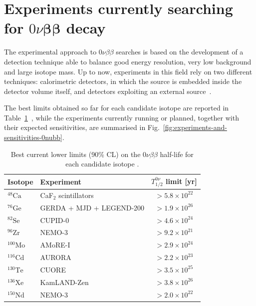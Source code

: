 \section{Experiments currently searching for \texorpdfstring{$0\nu\boldsymbol{\beta}\boldsymbol{\beta}$}{0nu beta beta} decay}
\label{sec:0nubb-experiments}
The experimental approach to $0\nu\beta\beta$ searches is based on the development of a detection technique able to balance good energy resolution, very low background and large isotope mass. Up to now, experiments in this field rely on two different techniques: calorimetric detectors, in which the source is embedded inside the detector volume itself, and detectors exploiting an external source~\cite{review-0nu-2015}. 

The best limits obtained so far for each candidate isotope are reported in Table~\ref{tab:0nubb-limits}~\cite{PDG:2026}, while the experiments currently running or planned, together with their expected sensitivities, are summarised in Fig.~\ref{fig:experiments-and-sensitivities-0nubb}.
\begin{table}[H]
    \centering
    \begin{tabular}{llc}
        \toprule
        Isotope & Experiment & $T_{1/2}^{0\nu}$ limit [yr] \\
        \midrule
        ${}^{48}\text{Ca}$  & CaF$_2$ scintillators     & $> 5.8 \times 10^{22}$ \\
        ${}^{76}\text{Ge}$  & GERDA + MJD + LEGEND-200  & $> 1.9 \times 10^{26}$ \\
        ${}^{82}\text{Se}$  & CUPID-0                   & $> 4.6 \times 10^{24}$ \\
        ${}^{96}\text{Zr}$  & NEMO-3                    & $> 9.2 \times 10^{21}$ \\
        ${}^{100}\text{Mo}$ & AMoRE-I                   & $> 2.9 \times 10^{24}$ \\
        ${}^{116}\text{Cd}$ & AURORA                    & $> 2.2 \times 10^{23}$ \\
        ${}^{130}\text{Te}$ & CUORE                     & $> 3.5 \times 10^{25}$ \\
        ${}^{136}\text{Xe}$ & KamLAND-Zen               & $> 3.8 \times 10^{26}$ \\
        ${}^{150}\text{Nd}$ & NEMO-3                    & $> 2.0 \times 10^{22}$ \\
        \bottomrule
    \end{tabular}
    \caption{Best current lower limits (90\% CL) on the $0\nu\beta\beta$ half-life for each candidate isotope \cite{PDG:2026}.}
    \label{tab:0nubb-limits}
\end{table}

